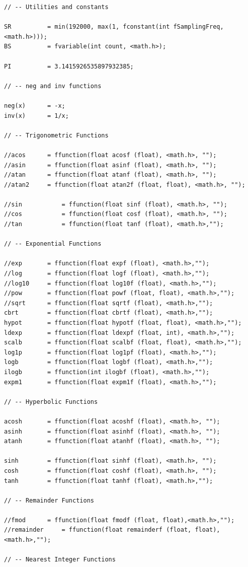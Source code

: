 \documentclass{article}
\begin{document}
\begin{lstlisting}[caption=\texttt{math.lib}]
// -- Utilities and constants

SR 			= min(192000, max(1, fconstant(int fSamplingFreq, <math.h>)));
BS          = fvariable(int count, <math.h>);

PI          = 3.1415926535897932385;

// -- neg and inv functions

neg(x)      = -x;
inv(x)      = 1/x;

// -- Trigonometric Functions

//acos		= ffunction(float acosf (float), <math.h>, "");
//asin		= ffunction(float asinf (float), <math.h>, "");
//atan		= ffunction(float atanf (float), <math.h>, "");
//atan2		= ffunction(float atan2f (float, float), <math.h>, "");

//sin			= ffunction(float sinf (float), <math.h>, "");
//cos			= ffunction(float cosf (float), <math.h>, "");
//tan			= ffunction(float tanf (float), <math.h>,"");

// -- Exponential Functions

//exp 		= ffunction(float expf (float), <math.h>,"");
//log 		= ffunction(float logf (float), <math.h>,"");
//log10 	= ffunction(float log10f (float), <math.h>,"");
//pow 		= ffunction(float powf (float, float), <math.h>,"");
//sqrt 		= ffunction(float sqrtf (float), <math.h>,"");
cbrt 		= ffunction(float cbrtf (float), <math.h>,"");
hypot 		= ffunction(float hypotf (float, float), <math.h>,"");
ldexp 		= ffunction(float ldexpf (float, int), <math.h>,"");
scalb 		= ffunction(float scalbf (float, float), <math.h>,"");
log1p 		= ffunction(float log1pf (float), <math.h>,"");
logb 		= ffunction(float logbf (float), <math.h>,"");
ilogb 		= ffunction(int ilogbf (float), <math.h>,"");
expm1 		= ffunction(float expm1f (float), <math.h>,"");

// -- Hyperbolic Functions

acosh		= ffunction(float acoshf (float), <math.h>, "");
asinh		= ffunction(float asinhf (float), <math.h>, "");
atanh		= ffunction(float atanhf (float), <math.h>, "");

sinh		= ffunction(float sinhf (float), <math.h>, "");
cosh		= ffunction(float coshf (float), <math.h>, "");
tanh		= ffunction(float tanhf (float), <math.h>,"");

// -- Remainder Functions

//fmod 		= ffunction(float fmodf (float, float),<math.h>,"");
//remainder 	= ffunction(float remainderf (float, float),<math.h>,"");

// -- Nearest Integer Functions


\end{lstlisting}
\end{document}
